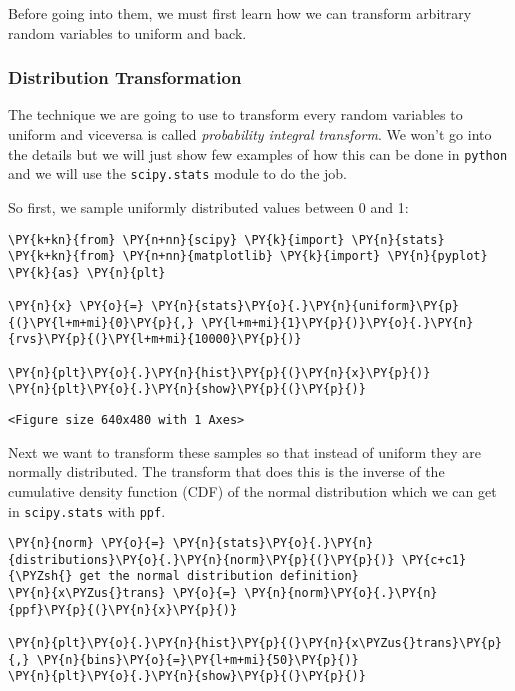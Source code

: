Before going into them, we must first learn how we can transform
arbitrary random variables to uniform and back.

\hypertarget{distribution-transformation}{%
\subsubsection{Distribution
Transformation}\label{distribution-transformation}}

The technique we are going to use to transform every random variables to
uniform and viceversa is called \emph{probability integral transform}.
We won't go into the details but we will just show few examples of how
this can be done in \texttt{python} and we will use the
\texttt{scipy.stats} module to do the job.

So first, we sample uniformly distributed values between 0 and 1:

    \begin{tcolorbox}[breakable, size=fbox, boxrule=1pt, pad at break*=1mm,colback=cellbackground, colframe=cellborder]
\begin{Verbatim}[commandchars=\\\{\}]
\PY{k+kn}{from} \PY{n+nn}{scipy} \PY{k}{import} \PY{n}{stats}
\PY{k+kn}{from} \PY{n+nn}{matplotlib} \PY{k}{import} \PY{n}{pyplot} \PY{k}{as} \PY{n}{plt}

\PY{n}{x} \PY{o}{=} \PY{n}{stats}\PY{o}{.}\PY{n}{uniform}\PY{p}{(}\PY{l+m+mi}{0}\PY{p}{,} \PY{l+m+mi}{1}\PY{p}{)}\PY{o}{.}\PY{n}{rvs}\PY{p}{(}\PY{l+m+mi}{10000}\PY{p}{)}

\PY{n}{plt}\PY{o}{.}\PY{n}{hist}\PY{p}{(}\PY{n}{x}\PY{p}{)}
\PY{n}{plt}\PY{o}{.}\PY{n}{show}\PY{p}{(}\PY{p}{)}
\end{Verbatim}
\end{tcolorbox}

    
    \begin{verbatim}
<Figure size 640x480 with 1 Axes>
    \end{verbatim}

    
    Next we want to transform these samples so that instead of uniform they
are normally distributed. The transform that does this is the inverse of
the cumulative density function (CDF) of the normal distribution which
we can get in \texttt{scipy.stats} with \texttt{ppf}.

    \begin{tcolorbox}[breakable, size=fbox, boxrule=1pt, pad at break*=1mm,colback=cellbackground, colframe=cellborder]
\begin{Verbatim}[commandchars=\\\{\}]
\PY{n}{norm} \PY{o}{=} \PY{n}{stats}\PY{o}{.}\PY{n}{distributions}\PY{o}{.}\PY{n}{norm}\PY{p}{(}\PY{p}{)} \PY{c+c1}{\PYZsh{} get the normal distribution definition}
\PY{n}{x\PYZus{}trans} \PY{o}{=} \PY{n}{norm}\PY{o}{.}\PY{n}{ppf}\PY{p}{(}\PY{n}{x}\PY{p}{)}

\PY{n}{plt}\PY{o}{.}\PY{n}{hist}\PY{p}{(}\PY{n}{x\PYZus{}trans}\PY{p}{,} \PY{n}{bins}\PY{o}{=}\PY{l+m+mi}{50}\PY{p}{)}
\PY{n}{plt}\PY{o}{.}\PY{n}{show}\PY{p}{(}\PY{p}{)}
\end{Verbatim}
\end{tcolorbox}

